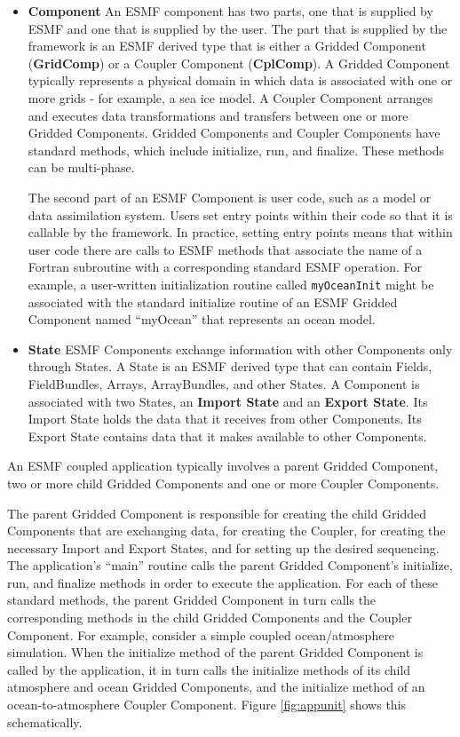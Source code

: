 \begin{itemize}
\item {\bf Component}  An ESMF component has two parts, one that is 
supplied by ESMF and one that is supplied by the user.  The
part that is supplied by the framework is an ESMF derived type that
is either a Gridded Component ({\bf GridComp}) or a Coupler 
Component ({\bf CplComp}).  A Gridded Component typically represents
a physical domain in which data is associated with one or more 
grids - for example, a sea ice model.  A Coupler Component 
arranges and executes data transformations and transfers between
one or more Gridded Components. Gridded Components and Coupler 
Components have standard methods, which include initialize, run,
and finalize.  These methods can be multi-phase.

The second part of an ESMF Component is user code, such as a
model or data assimilation system.  Users set entry points 
within their code so that it is callable by the framework.  
In practice, setting entry points means that within user code 
there are calls to ESMF methods that associate the name of a 
Fortran subroutine with a corresponding standard ESMF operation.  
For example, a user-written initialization routine called 
{\tt myOceanInit} might be associated with the standard 
initialize routine of an ESMF Gridded Component named ``myOcean'' 
that represents an ocean model.

\item {\bf State}  ESMF Components exchange information with other 
Components only through States.  A State is an ESMF derived
type that can contain Fields, FieldBundles, Arrays, ArrayBundles,
and other States.  A Component is associated with two States, an 
{\bf Import State} and an {\bf Export State}.  Its Import State 
holds the data that it receives from other Components.  
Its Export State contains data that it makes available to 
other Components. 

\end{itemize}

An ESMF coupled application typically involves a parent Gridded Component, 
two or more child Gridded Components and one or more Coupler 
Components. 

The parent Gridded Component is responsible for creating the child 
Gridded Components that are exchanging data, for creating the Coupler, 
for creating the necessary Import and Export States, and for 
setting up the desired sequencing.  The application's ``main'' routine
calls the parent Gridded Component's initialize, run, and finalize 
methods in order to execute the application.  For each of these
standard methods, the parent Gridded Component in turn calls the 
corresponding methods in the child Gridded Components and the 
Coupler Component.  For example, consider a simple coupled 
ocean/atmosphere simulation.  When the initialize method of the 
parent Gridded Component is called by the application, it in turn 
calls the initialize methods of its child atmosphere and ocean 
Gridded Components, and the initialize method of an 
ocean-to-atmosphere Coupler Component.  Figure \ref{fig:appunit}
shows this schematically.

